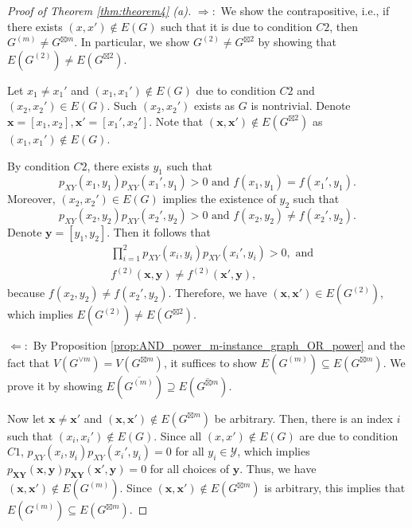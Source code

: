 \documentclass[journal, onecolumn, draftcls]{IEEEtran}
\theoremstyle{definition}
\newcommand{\calY}{\mathcal{Y}}
\newcommand{\bfy}{\mathbf{y}}
\newcommand{\bfX}{\mathbf{X}}
\newcommand{\bfY}{\mathbf{Y}}
\newcommand{\bfx}{\mathbf{x}}
\begin{document}
\begin{proof}[Proof of Theorem \ref{thm:theorem4} (a)]
$\Rightarrow:$ We show the contrapositive, i.e., if there exists $(x,x')\notin E(G)$ such that  it is due to condition $C2$, then $G^{(m)}\ne G^{\boxtimes m}$. In particular, we show $G^{(2)}\ne G^{\boxtimes 2}$ by showing that $E(G^{(2)})\ne E(G^{\boxtimes 2})$.

Let $x_1\ne x_1'$ and $(x_1,x_1')\notin E(G)$ due to condition $C2$ and $(x_2,x_2')\in E(G)$. Such $(x_2,x_2')$ exists as $G$ is nontrivial. Denote $\bfx=[x_1,x_2],\bfx'=[x_1',x_2']$.    Note that $(\bfx,\bfx')\notin E(G^{\boxtimes 2})$ as $(x_1,x_1')\notin E(G)$.

By condition $C2$, there exists $y_1$ such that $$p_{XY}(x_1,y_1)p_{XY}(x_1',y_1)>0\text{ and }f(x_1,y_1)= f(x_1',y_1). $$
Moreover, $(x_2,x_2')\in E(G)$ implies the existence of $y_2$ such that  $$
p_{XY}(x_2,y_2)p_{XY}(x_2',y_2)>0\text{ and } f(x_2,y_2) \ne f(x_2',y_2). 
$$
Denote $\bfy=[y_1,y_2]$.  Then it follows that  
\begin{align*}
    &\prod_{i=1}^2p_{XY}(x_i,y_i)p_{XY}(x_i',y_i)>0,\text{ and}\\
    &f^{(2)}(\bfx,\bfy)\ne f^{(2)}(\bfx',\bfy),
\end{align*}because $f(x_2,y_2)\ne f(x_2',y_2)$. Therefore, we have $(\bfx,\bfx')\in E(G^{(2)})$, which implies $E(G^{(2)})\ne E(G^{\boxtimes 2})$. 

$\Leftarrow:$ By Proposition \ref{prop:AND_power_m-instance_graph_OR_power} and the fact that $V(G^{\lor m})  = V(G^{\boxtimes m})$, it suffices to show $E(G^{(m)}) \subseteq E(G^{\boxtimes m})$. We prove it by showing $E(\overline{G^{(m)}}) \supseteq E(\overline{G^{\boxtimes m}}).$

Now let $\bfx\ne \bfx'$ and $ (\bfx,\bfx') \notin E(G^{\boxtimes m})$ be arbitrary. Then, there is an index $i$ such that   $(x_i,x_i')\notin E(G)$. Since all $(x,x')\notin E(G)$ are due to condition $C1$,   $p_{XY}(x_i,y_i)p_{XY}(x_i',y_i)=0$ for all $y_i\in \calY$, which implies  $p_{\bfX\bfY}(\bfx,\bfy)p_{\bfX\bfY}(\bfx',\bfy)= 0$ for all choices of $\bfy$. Thus, we have $(\bfx,\bfx') \notin E(G^{(m)})$. Since $(\bfx,\bfx') \notin E(G^{\boxtimes m})$ is arbitrary, this implies that $E(G^{(m)}) \subseteq E(G^{\boxtimes m})$.
\end{proof} 
\end{document}

